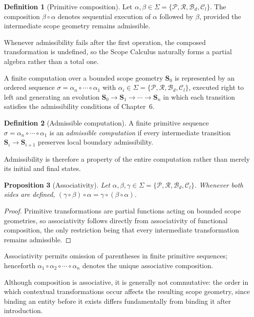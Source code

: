 \documentclass[11pt,twoside,openright]{book}
\numberwithin{equation}{chapter}
\theoremstyle{definition}
\newtheorem{definition}{Definition}[chapter]
\theoremstyle{plain}
\newtheorem{proposition}[definition]{Proposition}
\theoremstyle{remark}
\theoremstyle{definition}
\newcommand{\Scope}{\mathbf{S}}
\newcommand{\ScopeMorph}{\sigma}
\newcommand{\Alphabet}{\Sigma}
\newcommand{\Pop}{\mathcal{P}}
\newcommand{\Refuse}{\mathcal{R}}
\newcommand{\Bind}{\mathcal{B}_d}
\newcommand{\Collapse}{\mathcal{C}_l}
\newcommand{\ScopeAlphabet}{\Alphabet=\{\Pop,\Refuse,\Bind,\Collapse\}}
\begin{document}
\begin{definition}[Primitive composition]
Let $\alpha,\beta\in\ScopeAlphabet$. The composition $\beta\circ\alpha$
denotes sequential execution of $\alpha$ followed by $\beta$, provided the
intermediate scope geometry remains admissible.
\end{definition}

Whenever admissibility fails after the first operation, the composed
transformation is undefined, so the Scope Calculus naturally forms a
partial algebra rather than a total one.

A finite computation over a bounded scope geometry $\Scope_0$ is
represented by an ordered sequence
$\ScopeMorph=\alpha_n\circ\cdots\circ\alpha_1$ with $\alpha_i\in\ScopeAlphabet$,
executed right to left and generating an evolution
$\Scope_0\to\Scope_1\to\cdots\to\Scope_n$ in which each transition
satisfies the admissibility conditions of Chapter~6.

\begin{definition}[Admissible computation]
A finite primitive sequence $\ScopeMorph=\alpha_n\circ\cdots\circ\alpha_1$ is
an \emph{admissible computation} if every intermediate transition
$\Scope_i\to\Scope_{i+1}$ preserves local boundary admissibility.
\end{definition}

Admissibility is therefore a property of the entire computation rather
than merely its initial and final states.

\begin{proposition}[Associativity]
Let $\alpha,\beta,\gamma\in\ScopeAlphabet$. Whenever both sides are
defined, $(\gamma\circ\beta)\circ\alpha=\gamma\circ(\beta\circ\alpha)$.
\end{proposition}

\begin{proof}
Primitive transformations are partial functions acting on bounded scope
geometries, so associativity follows directly from associativity of
functional composition, the only restriction being that every
intermediate transformation remains admissible.
\end{proof}

Associativity permits omission of parentheses in finite primitive
sequences; henceforth $\alpha_1\circ\alpha_2\circ\cdots\circ\alpha_n$
denotes the unique associative composition.

Although composition is associative, it is generally not commutative: the
order in which contextual transformations occur affects the resulting
scope geometry, since binding an entity before it exists differs
fundamentally from binding it after introduction.
\end{document}
